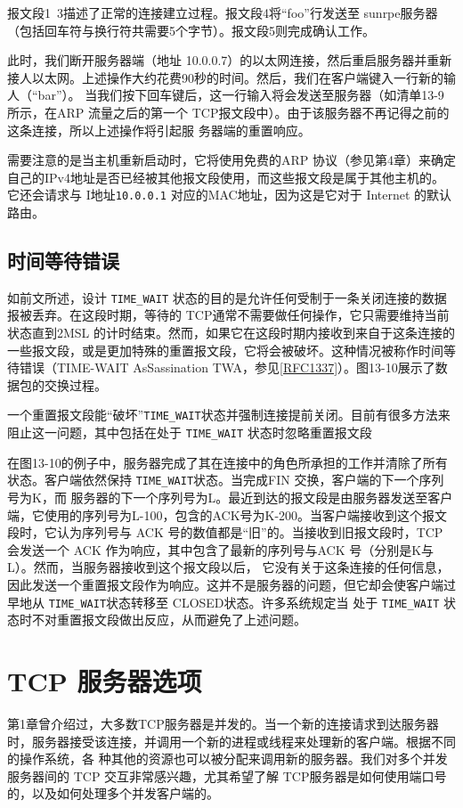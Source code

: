 报文段1~3描述了正常的连接建立过程。报文段4将“foo”行发送至 sunrpe服务器（包括回车符与换行符共需要5个字节）。报文段5则完成确认工作。

此时，我们断开服务器端（地址
10.0.0.7）的以太网连接，然后重启服务器并重新接人以太网。上述操作大约花费90秒的时间。然后，我们在客户端键入一行新的输人（“bar”）。
当我们按下回车键后，这一行输入将会发送至服务器（如清单13-9所示，在ARP 流量之后的第一个
TCP报文段中）。由于该服务器不再记得之前的这条连接，所以上述操作将引起服
务器端的重置响应。

需要注意的是当主机重新启动时，它将使用免费的ARP
协议（参见第4章）来确定自己的IPv4地址是否已经被其他报文段使用，而这些报文段是属于其他主机的。它还会请求与
I地址\verb|10.0.0.1| 对应的MAC地址，因为这是它对于 Internet 的默认路由。

\subsection{时间等待错误}
如前文所述，设计 \verb|TIME_WAIT| 状态的目的是允许任何受制于一条关闭连接的数据报被丢弃。在这段时期，等待的
TCP通常不需要做任何操作，它只需要维持当前状态直到2MSL
的计时结束。然而，如果它在这段时期内接收到来自于这条连接的一些报文段，或是更加特殊的重置报文段，它将会被破坏。这种情况被称作时间等待错误（TIME-WAIT
AsSassination
TWA，参见\href{https://www.rfc-editor.org/rfc/rfc1337}{[RFC1337]}）。图13-10展示了数据包的交换过程。

一个重置报文段能“破坏”\verb|TIME_WAIT|状态并强制连接提前关闭。目前有很多方法来阻止这一问题，其中包括在处于
\verb|TIME_WAIT| 状态时忽略重置报文段

在图13-10的例子中，服务器完成了其在连接中的角色所承担的工作并清除了所有状态。客户端依然保持
\verb|TIME_WAIT|状态。当完成FIN 交换，客户端的下一个序列号为K，而
服务器的下一个序列号为L。最近到达的报文段是由服务器发送至客户端，它使用的序列号为L-100，包含的ACK号为K-200。当客户端接收到这个报文段时，它认为序列号与
ACK 号的数值都是“旧”的。当接收到旧报文段时，TCP 会发送一个 ACK 作为响应，其中包含了最新的序列号与ACK
号（分别是K与L）。然而，当服务器接收到这个报文段以后，
它没有关于这条连接的任何信息，因此发送一个重置报文段作为响应。这并不是服务器的问题，但它却会使客户端过早地从
\verb|TIME_WAIT|状态转移至 CLOSED状态。许多系统规定当
处于 \verb|TIME_WAIT| 状态时不对重置报文段做出反应，从而避免了上述问题。
\section{TCP 服务器选项}
第1章曾介绍过，大多数TCP服务器是并发的。当一个新的连接请求到达服务器时，服务器接受该连接，并调用一个新的进程或线程来处理新的客户端。根据不同的操作系统，各
种其他的资源也可以被分配来调用新的服务器。我们对多个并发服务器间的 TCP 交互非常感兴趣，尤其希望了解
TCP服务器是如何使用端口号的，以及如何处理多个并发客户端的。

